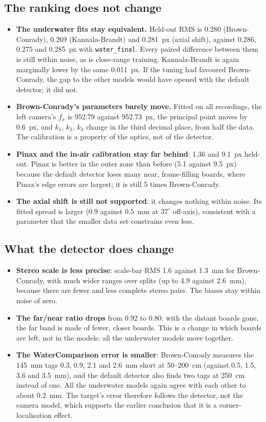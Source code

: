 \subsection{The ranking does not change}
\begin{itemize}
\item \textbf{The underwater fits stay equivalent.} Held-out RMS is 0.280 (Brown-Conrady), 0.269
(Kannala-Brandt) and 0.281~px (axial shift), against 0.286, 0.275 and 0.285~px with \texttt{water\_final}.
Every paired difference between them is still within noise, as is close-range training. Kannala-Brandt is
again marginally lower by the same 0.011~px. If the tuning had favoured Brown-Conrady, the gap to the other
models would have opened with the default detector; it did not.
\item \textbf{Brown-Conrady's parameters barely move.} Fitted on all recordings, the left camera's
$f_x$ is 952.79 against 952.73~px, the principal point moves by 0.6~px, and $k_1$, $k_2$, $k_3$ change in the
third decimal place, from half the data. The calibration is a property of the optics, not of the detector.
\item \textbf{Pinax and the in-air calibration stay far behind}: 1.36 and 9.1~px held-out. Pinax is better
in the outer zone than before (5.1 against 9.5~px) because the default detector loses many near, frame-filling
boards, where Pinax's edge errors are largest; it is still 5 times Brown-Conrady.
\item \textbf{The axial shift is still not supported}: it changes nothing within noise. Its fitted spread is
larger (0.9 against 0.5~mm at $37^\circ$ off-axis), consistent with a parameter that the smaller data set
constrains even less.
\end{itemize}

\subsection{What the detector does change}
\begin{itemize}
\item \textbf{Stereo scale is less precise}: scale-bar RMS 1.6 against 1.3~mm for Brown-Conrady, with much
wider ranges over splits (up to 4.9 against 2.6~mm), because there are fewer and less complete stereo pairs.
The biases stay within noise of zero.
\item \textbf{The far/near ratio drops} from 0.92 to 0.80: with the distant boards gone, the far band is made
of fewer, closer boards. This is a change in which boards are left, not in the models; all the underwater
models move together.
\item \textbf{The WaterComparison error is smaller}: Brown-Conrady measures the 145~mm tags 0.3, 0.9, 2.1 and
2.6~mm short at 50--200~cm (against 0.5, 1.5, 3.6 and 3.5~mm), and the default detector also finds two tags at
250~cm instead of one. All the underwater models again agree with each other to about 0.2~mm. The target's
error therefore follows the detector, not the camera model, which supports the earlier conclusion that it is a
corner-localisation effect.
\end{itemize}

